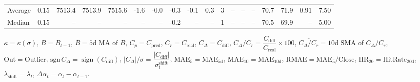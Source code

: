 \begin{threeparttable}
{\begin{tabular}{lrrrrrrrrrrrrrrrrr}
Average &     0.15 & 7513.4 & 7513.9 & 7515.6 &       -1.6 &           -0.0 &                      -0.3 &                     -0.1 &                 0.3 &              3 &         -- &        -- &             -- &             70.7 &                71.9 &            0.91 &                   7.50 \\
 Median &     0.15 &     -- &     -- &     -- &         -- &             -- &                      -0.2 &                       -- &                  -- &              1 &         -- &        -- &             -- &             70.5 &                69.9 &              -- &                   5.00 \\
\bottomrule
\end{tabular}
}
\begin{tablenotes}\footnotesize
\item $\kappa=\kappa(\sigma)$, $B=B_{t-1}$, $\overline{B}=\text{5d MA of }B$, $C_p=C_{\text{pred}}$, $C_r=C_{\text{real}}$, $C_\Delta=C_{\text{diff}}$, $C_\Delta/C_r=\dfrac{C_{\text{diff}}}{C_{\text{real}}}\times100$, $\overline{C_\Delta/C_r}=\text{10d SMA of }C_\Delta/C_r$, $\mathrm{Out}=\text{Outlier}$, $\mathrm{sgn}\,C_\Delta=\operatorname{sign}(C_{\text{diff}})$, $|C_\Delta|/\sigma=\dfrac{|C_{\text{diff}}|}{\sigma_t^{\text{shift}}}$, $\mathrm{MAE}_5=\mathrm{MAE}_{5\text{d}}$, $\mathrm{MAE}_{10}=\mathrm{MAE}_{10\text{d}}$, $\mathrm{RMAE}= \mathrm{MAE}_5 / \text{Close}$, $\mathrm{HR}_{20}=\mathrm{HitRate}_{20\text{d}}$, $\lambda_{\text{shift}}=\lambda_t$, $\Delta\alpha_t=\alpha_t-\alpha_{t-1}$.
\end{tablenotes}
\end{threeparttable}
\endgroup

